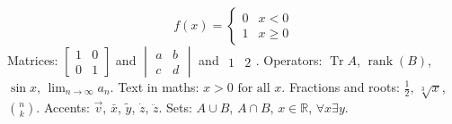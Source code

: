 
\[
f(x) = \begin{cases} 0 & x < 0 \\ 1 & x \ge 0 \end{cases}
\]
Matrices: $\begin{bmatrix} 1 & 0 \\ 0 & 1 \end{bmatrix}$ and $\begin{vmatrix} a & b \\ c & d \end{vmatrix}$ and
$\begin{matrix} 1 & 2 \end{matrix}$.
Operators: $\operatorname{Tr} A$, $\operatorname{rank}(B)$, $\sin x$, $\lim_{n\to\infty} a_n$.
Text in maths: $x > 0 \text{ for all } x$.
Fractions and roots: $\frac{1}{2}$, $\sqrt[3]{x}$, $\binom{n}{k}$.
Accents: $\vec{v}$, $\bar{x}$, $\tilde{y}$, $\dot{z}$, $\ddot{z}$.
Sets: $A \cup B$, $A \cap B$, $x \in \mathbb{R}$, $\forall x \exists y$.

